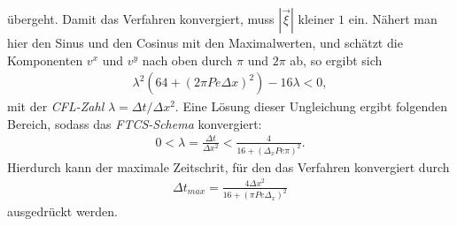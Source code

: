\documentclass[12pt,a4paper,titlepage,headinclude,bibtotoc]{scrartcl}
\begin{document}
übergeht. Damit das Verfahren konvergiert, muss $|\vec{\xi}|$ kleiner $1$ ein. Nähert man hier den Sinus und den Cosinus mit den Maximalwerten, und schätzt die Komponenten $v^x$ und $v^y$ nach oben durch $\pi$ und $2\pi$ ab, so ergibt sich
\begin{align}
\lambda^2 \left(64 + (2 \pi Pe \Delta x)^2 \right) -16 \lambda <0,
\end{align}
mit der \textit{CFL-Zahl} $\lambda = \Delta t/\Delta x^2$.
Eine Lösung dieser Ungleichung ergibt folgenden Bereich, sodass das \textit{FTCS-Schema} konvergiert:
\begin{align}
0 < \lambda = \frac{\Delta t}{\Delta x^2} < \frac{4}{16 + (\Delta_x Pe \pi)^2}.
\end{align}
Hierdurch kann der maximale Zeitschrit, für den das Verfahren konvergiert durch
\begin{align}
\label{eq:neumann_delta_t_max}
\Delta t_{max} = \frac{4 \Delta x^2}{16 + \left(\pi Pe \Delta_x \right)^2}
\end{align}
ausgedrückt werden.\\


\newpage
\end{document}
